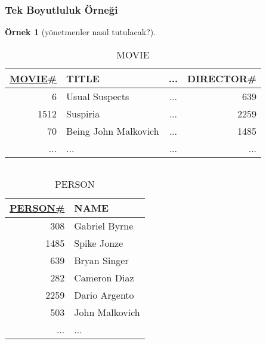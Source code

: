 \documentclass[dvipsnames]{beamer}
\theoremstyle{definition}
\theoremstyle{example}
\newtheorem{ornek}[theorem]{Örnek}
\theoremstyle{plain}
\begin{document}
\begin{frame}
  \frametitle{Tek Boyutluluk Örneği}

  \begin{ornek}[yönetmenler nasıl tutulacak?]
    \begin{tiny}
    \begin{table}
      \caption{MOVIE}
      \begin{tabular}{|r|l|c|r|}\hline
\underline{MOVIE\#} & TITLE                & ... & DIRECTOR\#\\[2pt]\hline\hline
                  6 & Usual Suspects       & ... &        639\\\hline
               1512 & Suspiria             & ... &       2259\\\hline
                 70 & Being John Malkovich & ... &       1485\\\hline
                ... & ...                  & ... &        ...\\\hline
      \end{tabular}
    \end{table}
    \end{tiny}

    \begin{columns}[t]
      \begin{tiny}
      \begin{table}
        \caption{PERSON}
        \begin{tabular}{|r|l|}\hline
\underline{PERSON\#} & NAME          \\[2pt]\hline\hline
                 308 & Gabriel Byrne \\\hline
                1485 & Spike Jonze   \\\hline
                 639 & Bryan Singer  \\\hline
                 282 & Cameron Diaz  \\\hline
                2259 & Dario Argento \\\hline
                 503 & John Malkovich\\\hline
                 ... & ...           \\\hline
        \end{tabular}
      \end{table}
      \end{tiny}


\end{columns}
\end{ornek}
\end{frame}
\end{document}
